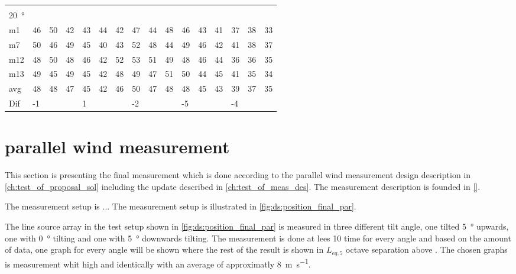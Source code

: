 \begin{table}[H]
\begin{tabular}{l|l|l|l|l|l|l|l|l|l|l|l|l|lll}
 \multicolumn{16}{l}{ } \\                             
\SI{20}{\degree}   & \multicolumn{3}{l|}{} & \multicolumn{3}{l|}{} & \multicolumn{3}{l|}{} & \multicolumn{3}{l|}{} & \multicolumn{3}{l}{}   \\  \hline
m1    &46      &  50    &  42    &   43   &  44    &  42    &  47    &   44    &  48    &    46   &  43    &  41    & \multicolumn{1}{l|}{37} & \multicolumn{1}{l|}{38} &33  \\
m7    & 50     &  46    &  49    &   45   &  40    &   43   &   52   &   48    &  44    &    49   & 46     &  42    & \multicolumn{1}{l|}{41} & \multicolumn{1}{l|}{38} &37  \\
m12  & 48     &  50    &  48    &  46    &  42    &   52   &   53   &   51    &   49   &   48    &  46    & 44     & \multicolumn{1}{l|}{36} & \multicolumn{1}{l|}{36} & 35 \\
m13  &  49    &  45    &  49    &  45    &  42    &   48   &   49   &   47    &  51    &   50    &  44    &  45    & \multicolumn{1}{l|}{41} & \multicolumn{1}{l|}{35} & 34 \\ \hline
avg &  48    & 48     &   47   &  45    & 42     &  46    &  50    &  47     &  48    &  48     &   45   & 43     & \multicolumn{1}{l|}{39} & \multicolumn{1}{l|}{37}  &35  \\ \hline  
Dif & \multicolumn{3}{l|}{-1} & \multicolumn{3}{l|}{1} & \multicolumn{3}{l|}{-2} & \multicolumn{3}{l|}{-5} & \multicolumn{3}{l}{-4}                                
\end{tabular}
\end{table}

\section{parallel wind measurement}\label{mes:kudo:par_mes}
This section is presenting the final measurement which is done according to the parallel wind measurement design description in \autoref{ch:test_of_proposal_sol} including the update described in \autoref{ch:test_of_meas_des}. The measurement description is founded in \autoref{}. 

The measurement setup is ... The measurement setup is illustrated in \autoref{fig:ds:position_final_par}.


The line source array in the test setup shown in \autoref{fig:ds:position_final_par} is measured in three different tilt angle, one tilted \SI{5}{\degree} upwards, one with \SI{0}{\degree} tilting and one with \SI{5}{\degree} downwards tilting. The measurement is done at lees 10 time for every angle and based on the amount of data, one graph for every angle will be shown where the rest of the result is shown in $L_{eq,5}$ octave separation above . The chosen graphs is measurement whit high and identically with an average of approximatly \SI{8}{\meter\per\second}.

